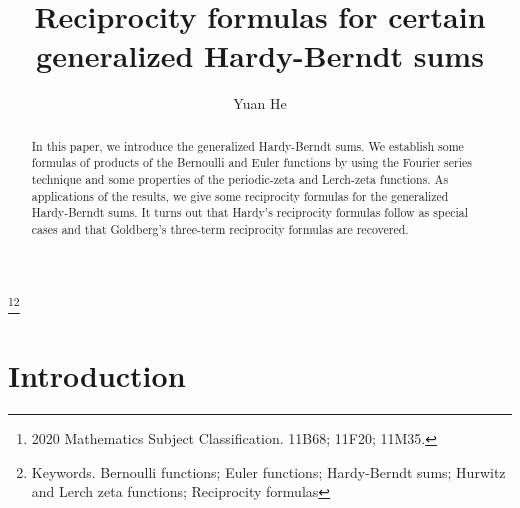 \documentclass[reqno]{amsart}
\numberwithin{equation}{section}
\begin{document}
\setcounter{page}{1}

\title[Reciprocity formulas]{Reciprocity formulas for certain generalized Hardy-Berndt sums}
\thanks{2020 Mathematics Subject Classification. 11B68; 11F20; 11M35.}\thanks{Keywords. Bernoulli functions; Euler functions; Hardy-Berndt sums; Hurwitz and Lerch zeta functions; Reciprocity formulas}
\author{Yuan He}
\address{School of Mathematics and Big Data, Neijiang Normal University, Neijiang 641100, Sichuan, People's Republic of China}

\begin{abstract}
In this paper, we introduce the generalized Hardy-Berndt sums. We establish some formulas of products of the Bernoulli and Euler functions by using the Fourier series technique and some properties of the periodic-zeta and Lerch-zeta functions. As applications of the results, we give some reciprocity formulas for the generalized Hardy-Berndt sums. It turns out that Hardy's reciprocity formulas follow as special cases and that Goldberg's three-term reciprocity formulas are recovered.
\end{abstract}

\maketitle

\section{Introduction}
\end{document}
